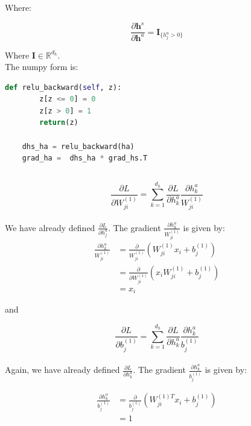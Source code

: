 \documentclass[reqno]{amsart}
\theoremstyle{definition}
\theoremstyle{remark}
\numberwithin{equation}{section}
\begin{document}
Where:

\begin{equation}
    \frac{\partial \mathbf{h}^s}{\partial \mathbf{h}^a} = \mathbf{I}_{\{h_j^a > 0\}}
\end{equation}

Where $\mathbf{I} \in \mathbb{R}^{d_h}$.\\

The numpy form is:

\begin{lstlisting}[language=Python]
    def relu_backward(self, z):
        z[z <= 0] = 0
        z[z > 0] = 1
        return(z)
    
    dhs_ha = relu_backward(ha)
    grad_ha =  dhs_ha * grad_hs.T 
\end{lstlisting}

\subsection{}

\begin{equation}
    \frac{\partial L}{\partial W^{(1)}_{ji}} = \sum_{k=1}^{d_h}\frac{\partial L}{\partial h^a_k}\frac{\partial h^a_k}{ W^{(1)}_{ji}}
\end{equation}\\

We have already defined $\frac{\partial L}{\partial h^a_j}$. The gradient $\frac{\partial h^a_k}{ W^{(1)}_{ji}}$ is given by:\\

\begin{align}
    \frac{\partial h^a_k}{ W^{(1)}_{ji}} &= \frac{\partial}{W^{(1)}_{ji}} (W_{ji}^{(1)} x_i + b_j^{(1)}) \\
    &= \frac{\partial}{\partial W_{ji}^{(1)}}( x_{i} W_{ji}^{(1)}+ b_j^{(1)})\\
    &= x_{i}
\end{align}

and

\begin{equation}
    \frac{\partial L}{\partial b^{(1)}_{j}} = \sum_{k=1}^{d_h}\frac{\partial L}{\partial h^a_k}\frac{\partial h^a_k}{b^{(1)}_{j}}
\end{equation}\\

Again, we have already defined $\frac{\partial L}{\partial h^a_k}$. The gradient $\frac{\partial h^a_k}{ b^{(1)}_{j}}$ is given by: 

\begin{align}
    \frac{\partial h^a_k}{ b^{(1)}_{j}} &= \frac{\partial}{b^{(1)}_{j}} (W_{ji}^{(1)T} x_i + b_j^{(1)}) \\
    &= 1
\end{align}
\end{document}
